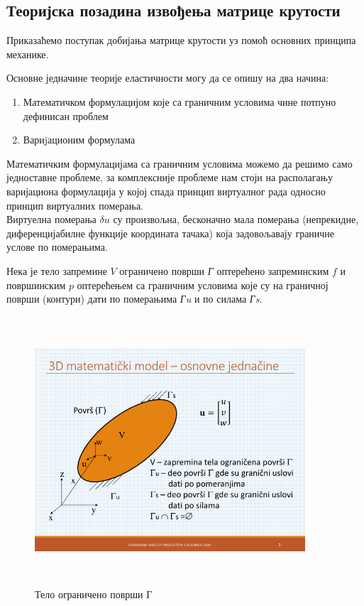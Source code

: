 \documentclass[11pt, a4paper]{article}
\begin{document}
\subsection{Теоријска позадина извођења матрице крутости}
Приказаћемо поступак добијања матрице крутости уз помоћ основних принципа механике.
\par
Основне једначине теорије еластичности могу да се опишу на два начина:
\begin{enumerate}
\item Математичком формулацијом које са граничним условима чине потпуно дефинисан проблем
\item Вариjационим формулама
\end{enumerate}
Математичким формулацијама са граничним условима можемо да решимо само једноставне проблеме, за комплексније проблеме нам стоји на располагању варијациона формулација у којој спада принцип виртуалног рада односно принцип виртуалних померања.\\
Виртуелна померања $\delta u$ \cite{mnd1} су произвољна, бесконачно мала померања (непрекидне, диференцијабилне функције координата тачака) која задовољавају граничне услове по померањима.\par
Нека је тело запремине $V$ ограничено површи \textit{Г} оптерећено запреминским $f$ и површинским $p$ оптерећењем са граничним условима које су на граничној површи (контури) дати по померањима \textit{Гu} и по силама \textit{Гs}.
\begin{figure}[H]
\includegraphics[width=0.9\textwidth, height=10cm]{Slike/Telo.png}
\caption{Тело ограничено површи Г \cite{mnd1}}
\end{figure}
\end{document}
